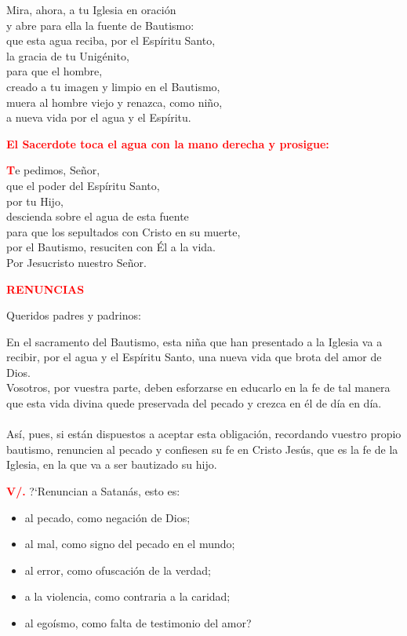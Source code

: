 \documentclass[12pt, letterpaper]{report}
\begin{document}
\Large Mira, ahora, a tu Iglesia en oraci\'on \\
y abre para ella la fuente de Bautismo: \\
que esta agua reciba, por el Esp\'iritu Santo, \\
la gracia de tu Unig\'enito, \\
para que el hombre, \\
creado a tu imagen y limpio en el Bautismo, \\
muera al hombre viejo y renazca, como ni\~no, \\
a nueva vida por el agua y el Esp\'iritu. \newline

\large {\bfseries \textcolor{red}{El Sacerdote toca el agua con la mano derecha y prosigue:}}

\lettrine[lines=1]{\bfseries \textcolor{red}{T}}{}\Large e pedimos, Se\~nor, \\
que el poder del Esp\'iritu Santo, \\
por tu Hijo, \\
descienda sobre el agua de esta fuente \\
para que los sepultados con Cristo en su muerte, \\
por el Bautismo, resuciten con \'El a la vida. \\
Por Jesucristo nuestro Se\~nor. \newline

\Large {\bfseries \textcolor{red}{RENUNCIAS}} \newline

\Large Queridos padres y padrinos: \newline

\Large En el sacramento del Bautismo, esta ni\~na que han presentado a la Iglesia va a recibir, por el agua y el Esp\'iritu Santo, una nueva vida que brota del amor de Dios.\\
Vosotros, por vuestra parte, deben esforzarse en educarlo en la fe de tal manera que esta vida divina quede preservada del pecado y crezca en \'el de d\'ia en d\'ia. \\ \\
As\'i, pues, si est\'an dispuestos a aceptar esta obligaci\'on, recordando vuestro propio bautismo, renuncien al pecado y confiesen su fe en Cristo Jes\'us, que es la fe de la Iglesia, en la que va a ser bautizado su hijo. \newline

\noindent
\Large {\bfseries \textcolor{red}{V/.}} \hspace{0.5cm} ?`Renuncian a Satan\'as, esto es:
\begin{itemize}[leftmargin=2.0cm,labelsep=0.5cm]
\item al pecado, como negaci\'on de Dios;
\item al mal, como signo del pecado en el mundo;
\item al error, como ofuscaci\'on de la verdad;
\item a la violencia, como contraria a la caridad;
\item al ego\'ismo, como falta de testimonio del amor?
\end{itemize}
\end{document}
